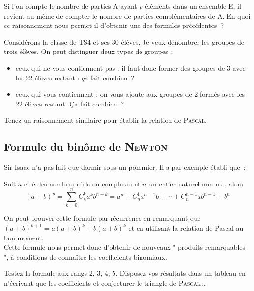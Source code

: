 \documentclass[french]{book}
\newcommand{\co}[2]{C_#2^#1}
\begin{document}
Si l'on compte le nombre de parties A ayant $p$ éléments dans un ensemble E, il revient au même de compter le nombre de parties
complémentaires de A. En quoi ce raisonnement nous permet-il d'obtenir une des formules précédentes~?




Considérons la classe de TS4 et ses 30 élèves. Je veux dénombrer les groupes de trois élèves. On peut distinguer deux types de
groupes~:

\begin{itemize}
\item ceux qui ne vous contiennent pas : il faut donc former des groupes de 3 avec les 22 élèves restant : ça fait combien~?
\item ceux qui vous contiennent : on vous ajoute aux groupes de 2 formés avec les 22 élèves restant. Ça fait combien~?
\end{itemize}



Tenez   un  raisonnement   similaire   pour  établir   la  relation   de
\textsc{Pascal}.



\subsection{Formule du binôme de \textsc{Newton}}

Sir Isaac  n'a pas  fait que dormir  sous un  pommier. Il a  par exemple
établi que~:


\begin{thm}
   Soit $a$ et $b$ des nombres réels ou complexes et $n$ un entier naturel non nul, alors
$$(a+b)^n=\sum_{k=0}^n\co{k}{n}a^kb^{n-k}=a^n+\co{1}{n}a^{n-1}b+\cdots+\co{{n-1}}{n}ab^{n-1}+b^n$$
\end{thm}


On peut prouver cette formule par récurrence en remarquant que $(a+b)^{k+1}=a(a+b)^k+b(a+b)^k$ et en
utilisant la relation de Pascal au bon moment.\\ 

Cette formule nous permet donc d'obtenir de nouveaux " produits remarquables ", à conditions de connaître les coefficients binomiaux.

Testez la formule aux rangs 2, 3, 4, 5. Disposez vos résultats dans un tableau en n'écrivant que les coefficients et conjecturer le
triangle de \textsc{Pascal}...
\end{document}
